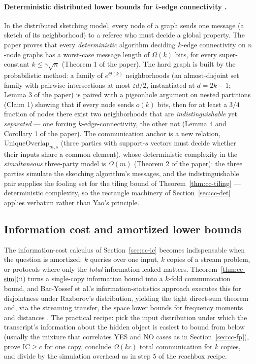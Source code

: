 \paragraph{Deterministic distributed lower bounds for $k$-edge connectivity
\citep{sigmod26-070}.}
In the distributed sketching model, every node of a graph sends one message (a
sketch of its neighborhood) to a referee who must decide a global property. The
paper proves that every \emph{deterministic} algorithm deciding $k$-edge
connectivity on $n$-node graphs has a worst-case message length of $\Omega(k)$ bits,
for every super-constant $k \le \gamma\sqrt{n}$ (Theorem 1 of the paper). The hard
graph is built by the probabilistic method: a family of $e^{\Theta(k)}$
neighborhoods (an almost-disjoint set family with pairwise intersections at most
$\varepsilon d/2$, instantiated at $d = 2k-1$; Lemma 3 of the paper) is paired with
a pigeonhole argument on nested partitions (Claim 1) showing that if every node
sends $o(k)$ bits, then for at least a $3/4$ fraction of nodes there exist two
neighborhoods that are \emph{indistinguishable} yet \emph{separated} --- one forcing
$k$-edge-connectivity, the other not (Lemma 4 and Corollary 1 of the paper). The
communication anchor is a new relation, $\mathrm{UniqueOverlap}_{m,s}$ (three
parties with support-$s$ vectors must decide whether their inputs share a common
element), whose deterministic complexity in the \emph{simultaneous} three-party
model is $\Omega(m)$ (Theorem 2 of the paper): the three parties simulate the
sketching algorithm's messages, and the indistinguishable pair supplies the fooling
set for the tiling bound of Theorem~\ref{thm:cc-tiling} --- deterministic
complexity, so the rectangle machinery of Section~\ref{sec:cc-det} applies verbatim
rather than Yao's principle.

\subsection{Information cost and amortized lower bounds}
\label{sec:cc-ic-advanced}

The information-cost calculus of Section~\ref{sec:cc-ic} becomes indispensable when
the question is amortized: $k$ queries over one input, $k$ copies of a stream
problem, or protocols where only the \emph{total} information leaked matters.
Theorem~\ref{thm:cc-sim}(ii) turns a single-copy information bound into a $k$-fold
communication bound, and Bar-Yossef et al.'s information-statistics approach
\citep{communication-complexity-bg5} executes this for disjointness under Razborov's
distribution, yielding the tight direct-sum theorem and, via the streaming transfer,
the space lower bounds for frequency moments and distances
\citep{communication-complexity-bg6,communication-complexity-bg7}. The practical
recipe: pick the input distribution under which the transcript's information about
the hidden object is easiest to bound from below (usually the mixture that
correlates YES and NO cases as in Section~\ref{sec:cc-fp}), prove
$\mathrm{IC} \ge c$ for one copy, conclude $\Omega(kc)$ total communication for $k$
copies, and divide by the simulation overhead as in step 5 of the reachbox recipe.

